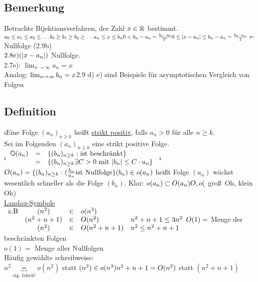 \subsection{Bemerkung}
Betrachte Bijektionsverfahren, der Zahl $x \in \mathbb{R}$ bestimmt.\\
$a_0 \leq a_1 \leq a_2 \leq \ldots\\
b_0 \geq b_1 \geq b_2 \geq \ldots\\
a_n \leq x \leq b_n\\
0 < b_n - a_n = \frac{b_0 - a_0}{2^n}\\
0 \leq \lvert x-a_n \rvert \leq b_n - a_n = \frac{b_0-a_n}{2} \Leftarrow$ Nullfolge (2.9b)\\
$2.8e) (\lvert x-a_n \rvert)$ Nullfolge.\\
2.7e): $\lim_{n \rightarrow \infty} a_n = x$\\
Analog: $\lim_{n \rightarrow \infty} b_n = x\\
$2.9 d) e) sind Beispiele für asymptotischen Vergleich von Folgen
\subsection{Definition}
\begin{enumerate}[a)]
\i Eine Folge $(a_n)_{ n \geq k}$ hei\ss t \underline{strikt positiv}, falls $a_n > 0$ für alle $n \geq k$.\\
Sei im Folgenden $(a_n)_{n \geq k}$ eine strikt positive Folge.\\
\i $\begin{array}{rcl}
\mathbb{O}(a_n) &=& \{ (b_n)_{n \geq k} : \text{ist beschränkt} \}\\
&=& \{ (b_n)_{n \geq k} \exists C > 0 \text{ mit } \lvert b_n \rvert \leq C \cdot a_n \}
\end{array}$
\i $O(a_n) = \{(b_n)_{n \geq k}: (\frac{b_n}{a_n} \text{ist Nullfolge} \}\\
(b_n) \in o(a_n)$ hei\ss t Folge $(a_n)$ wächst wesentlich schneller als die Folge $(b_n)$.
Klar: $o(a_n) \subset O(a_n)\\
O,o ($ \glqq gro\ss \ Oh\grqq, \glqq klein Oh\grqq)\\
\underline{Landau-Symbole}\\
$\begin{array}{lcrll}
\text{z.B}& (n^2) &\in& o(n^3)\\
& (n^2+n+1) &\in& O(n^2) & n^2 + n + 1 \leq 3n^2\\
& (n^2) &\in&O(n^2 + n +1) &n^2 \leq n^2 + n + 1
\end{array}\\
O(1) =$ Menge der beschränkten Folgen\\
$o(1)=$ Menge aller Nullfolgen\\
Häufig gewählte schreibweise:\\
$n^2 \underbrace{=}_{\text{eig. falsch!}} o(n^2)$ statt $(n^2) \in o(n^3)\\
n^2+n+1 =O(n^2)$ statt $(n^2+n+1)$
\end{enumerate}
